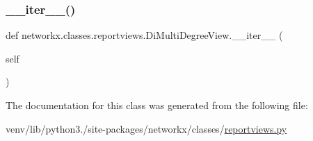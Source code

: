 \mbox{\label{classnetworkx_1_1classes_1_1reportviews_1_1DiMultiDegreeView_ab40278a07572fa262aad1ff4eb9eb4a0}} 
\subsubsection{\texorpdfstring{\+\_\+\+\_\+iter\+\_\+\+\_\+()}{\_\_iter\_\_()}}
{\footnotesize\ttfamily def networkx.\+classes.\+reportviews.\+Di\+Multi\+Degree\+View.\+\_\+\+\_\+iter\+\_\+\+\_\+ (\begin{DoxyParamCaption}\item[{}]{self }\end{DoxyParamCaption})}



The documentation for this class was generated from the following file\+:\begin{DoxyCompactItemize}
\item 
venv/lib/python3./site-\/packages/networkx/classes/\hyperlink{reportviews_8py}{reportviews.\+py}\end{DoxyCompactItemize}
